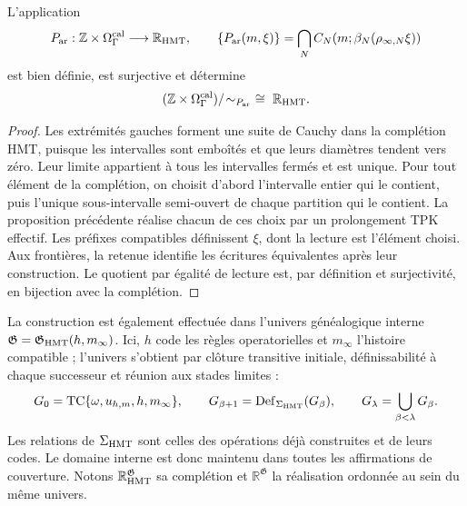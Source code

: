 \begin{proposition}
\label{hmtfg:cobertura-arquimediana}
L'application
\[
 P_{\rm ar}:\mathbb Z\times\Omega_\Gamma^{\rm cal}
       \longrightarrow\mathbb R_{\rm HMT},\qquad
 \{P_{\rm ar}(m,\xi)\}
    =\bigcap_N C_N(m;\beta_N(\rho_{\infty,N}\xi))
\]
est bien définie, est surjective et détermine
\[
 (\mathbb Z\times\Omega_\Gamma^{\rm cal})/\!\sim_{P_{\rm ar}}
       \ \cong\ \mathbb R_{\rm HMT}.
\]
\end{proposition}
\begin{proof}
Les extrémités gauches forment une suite de Cauchy dans la complétion HMT, puisque les intervalles sont emboîtés et que leurs diamètres tendent vers zéro. Leur limite appartient à tous les intervalles fermés et est unique. Pour tout élément de la complétion, on choisit d’abord l’intervalle entier qui le contient, puis l’unique sous-intervalle semi-ouvert de chaque partition qui le contient. La proposition précédente réalise chacun de ces choix par un prolongement TPK effectif. Les préfixes compatibles définissent \(\xi\), dont la lecture est l’élément choisi. Aux frontières, la retenue identifie les écritures équivalentes après leur construction. Le quotient par égalité de lecture est, par définition et surjectivité, en bijection avec la complétion.
\end{proof}

La construction est également effectuée dans l’univers généalogique interne \(\mathfrak G=\mathfrak G_{\rm HMT}(h,m_\infty)\). Ici, \(h\) code les règles operatorielles et \(m_\infty\) l’histoire compatible ; l’univers s’obtient par clôture transitive initiale, définissabilité à chaque successeur et réunion aux stades limites :
\[
 G_0=\operatorname{TC}\{\omega,u_{h,m},h,m_\infty\},\qquad
 G_{\beta+1}=\operatorname{Def}_{\Sigma_{\rm HMT}}(G_\beta),\qquad
 G_\lambda=\bigcup_{\beta<\lambda}G_\beta .
\]
Les relations de \(\Sigma_{\rm HMT}\) sont celles des opérations déjà construites et de leurs codes. Le domaine interne est donc maintenu dans toutes les affirmations de couverture. Notons \(\mathbb R_{\rm HMT}^{\mathfrak G}\) sa complétion et \(\mathbb R^{\mathfrak G}\) la réalisation ordonnée au sein du même univers.

